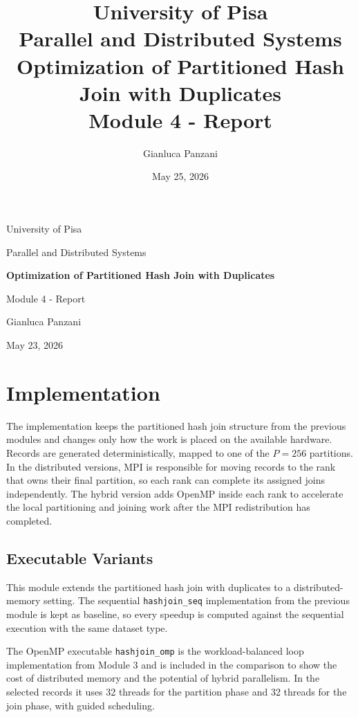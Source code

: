 \documentclass[11pt,a4paper]{article}
\title{
    University of Pisa\\
    Parallel and Distributed Systems\\[0.5em]
    Optimization of Partitioned Hash Join with Duplicates\\
    Module 4 - Report
}
\author{Gianluca Panzani}
\date{May 25, 2026}
\begin{document}
\begin{titlepage}
\centering
\vspace*{2.0cm}
{\Large University of Pisa\par}
\vspace{0.4cm}
{\large Parallel and Distributed Systems\par}
\vspace{1.6cm}
{\LARGE\bfseries Optimization of Partitioned Hash Join with Duplicates\par}
\vspace{0.6cm}
{\Large Module 4 - Report\par}
\vfill
{\large Gianluca Panzani\par}
\vspace{0.4cm}
{\large May 23, 2026\par}
\end{titlepage}

\clearpage
{}
\tableofcontents
\newpage
{}


\section{Implementation}

The implementation keeps the partitioned hash join structure from the previous modules and changes only how the work is placed on the available hardware.  Records are generated deterministically, mapped to one of the \(P=256\) partitions.  In the distributed versions, MPI is responsible for moving records to the rank that owns their final partition, so each rank can complete its assigned joins independently.  The hybrid version adds OpenMP inside each rank to accelerate the local partitioning and joining work after the MPI redistribution has completed.

\subsection{Executable Variants}

This module extends the partitioned hash join with duplicates to a distributed-memory setting.  The sequential \texttt{hashjoin\_seq} implementation from the previous module is kept as baseline, so every speedup is computed against the sequential execution with the same dataset type.

The OpenMP executable \texttt{hashjoin\_omp} is the workload-balanced loop implementation from Module 3 and is included in the comparison to show the cost of distributed memory and the potential of hybrid parallelism.  In the selected records it uses 32 threads for the partition phase and 32 threads for the join phase, with guided scheduling.
\end{document}
